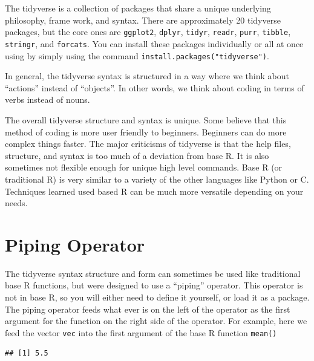 \documentclass[
]{book}
\newenvironment{Shaded}{\begin{snugshade}}{\end{snugshade}}
\newcommand{\DecValTok}[1]{\textcolor[rgb]{0.00,0.00,0.81}{#1}}
\newcommand{\KeywordTok}[1]{\textcolor[rgb]{0.13,0.29,0.53}{\textbf{#1}}}
\newcommand{\NormalTok}[1]{#1}
\newcommand{\OperatorTok}[1]{\textcolor[rgb]{0.81,0.36,0.00}{\textbf{#1}}}
\newcommand{\StringTok}[1]{\textcolor[rgb]{0.31,0.60,0.02}{#1}}
\begin{document}
The tidyverse is a collection of packages that share a unique underlying philosophy, frame work, and syntax. There are approximately 20 tidyverse packages, but the core ones are \texttt{ggplot2}, \texttt{dplyr}, \texttt{tidyr}, \texttt{readr}, \texttt{purr}, \texttt{tibble}, \texttt{stringr}, and \texttt{forcats}. You can install these packages individually or all at once using by simply using the command \texttt{install.packages("tidyverse")}.

In general, the tidyverse syntax is structured in a way where we think about ``actions'' instead of ``objects''. In other words, we think about coding in terms of verbs instead of nouns.

The overall tidyverse structure and syntax is unique. Some believe that this method of coding is more user friendly to beginners. Beginners can do more complex things faster. The major criticisms of tidyverse is that the help files, structure, and syntax is too much of a deviation from base R. It is also sometimes not flexible enough for unique high level commands. Base R (or traditional R) is very similar to a variety of the other languages like Python or C. Techniques learned used based R can be much more versatile depending on your needs.

\hypertarget{piping-operator}{%
\section{Piping Operator}\label{piping-operator}}

The tidyverse syntax structure and form can sometimes be used like traditional base R functions, but were designed to use a ``piping'' operator. This operator is not in base R, so you will either need to define it yourself, or load it as a package. The piping operator feeds what ever is on the left of the operator as the first argument for the function on the right side of the operator. For example, here we feed the vector \texttt{vec} into the first argument of the base R function \texttt{mean()}

\begin{Shaded}
\end{Shaded}

\begin{verbatim}
## [1] 5.5
\end{verbatim}
\end{document}
